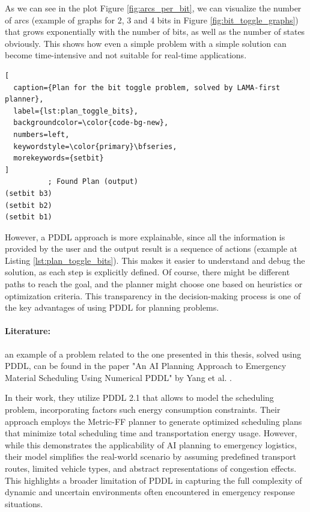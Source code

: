 As we can see in the plot Figure \ref{fig:arcs_per_bit}, we can visualize the number
of arcs (example of graphs for 2, 3 and 4 bits in Figure \ref{fig:bit_toggle_graphs})
that grows exponentially with the number of bits, as well as the number of states
obviously. This shows how even a simple problem with a simple solution can
become time-intensive and not suitable for real-time applications.

\begin{lstlisting}[
  caption={Plan for the bit toggle problem, solved by LAMA-first planner},
  label={lst:plan_toggle_bits},
  backgroundcolor=\color{code-bg-new},
  numbers=left,
  keywordstyle=\color{primary}\bfseries,
  morekeywords={setbit}
]
          ; Found Plan (output)
(setbit b3)
(setbit b2)
(setbit b1)
\end{lstlisting}

However, a PDDL approach is more explainable, since all the information is provided
by the user and the output result is a sequence of actions (example at Listing
\ref{lst:plan_toggle_bits}). This makes it easier to understand and debug the
solution, as each step is explicitly defined. Of course, there might be different
paths to reach the goal, and the planner might choose one based on heuristics or
optimization criteria. This transparency in the decision-making process is one of
the key advantages of using PDDL for planning problems.

\paragraph{Literature:}
an example of a problem related to the one presented in this thesis, solved using
PDDL, can be found in the paper "An AI Planning Approach to Emergency Material Scheduling
Using Numerical PDDL" by Yang et al. \cite{Yang2022}.

In their work, they utilize PDDL 2.1 that allows to model the scheduling problem,
incorporating factors such energy consumption constraints. Their approach
employs the Metric-FF planner to generate optimized scheduling plans that
minimize total scheduling time and transportation energy usage. However, while
this demonstrates the applicability of AI planning to emergency logistics, their
model simplifies the real-world scenario by assuming predefined transport routes,
limited vehicle types, and abstract representations of congestion effects. This
highlights a broader limitation of PDDL in capturing the full complexity of
dynamic and uncertain environments often encountered in emergency response
situations.

